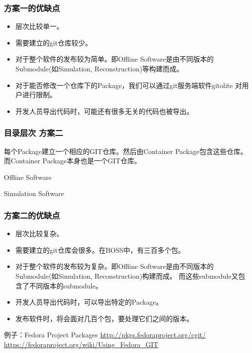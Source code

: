 \begin{frame}
    \frametitle{方案一的优缺点}
    \begin{itemize}
        \item 层次比较单一。
        \item 需要建立的git仓库较少。
        \item 对于整个软件的发布较为简单。即Offline Software是由不同版本的
              Submodule(如Simulation, Reconstruction)等构建而成。
        \item 对于能否修改一个仓库下的Package，我们可以通过git服务端软件gitolite
              对用户进行限制。
        \item 开发人员导出代码时，可能还有很多无关的代码也被导出。
    \end{itemize}
\end{frame}

\begin{frame}
    \frametitle{目录层次 方案二}
    每个Package建立一个相应的GIT仓库。然后由Container Package包含这些仓库。
    而Container Package本身也是一个GIT仓库。
    \renewcommand*\DTstylecomment{\rmfamily\color{red}\textsc}
    \begin{block}{Offline Software}
    \end{block}

    \begin{block}{Simulation Software}
    \end{block}
\end{frame}

\begin{frame}
    \frametitle{方案二的优缺点}
    \begin{itemize}
        \item 层次比较复杂。
        \item 需要建立的git仓库会很多。在BOSS中，有三百多个包。
        \item 对于整个软件的发布较为复杂。即Offline Software是由不同版本的
              Submodule(如Simulation, Reconstruction)构建而成。
              而这些submodule又包含了不同版本的submodule。
        \item 开发人员导出代码时，可以导出特定的Package。
        \item 发布软件时，将会面对几百个包，要处理它们之间的版本。
    \end{itemize}
    \begin{block}{例子：Fedora Project Packages}
        \url{http://pkgs.fedoraproject.org/cgit/}
        \url{https://fedoraproject.org/wiki/Using\_Fedora\_GIT}
    \end{block}
\end{frame}


